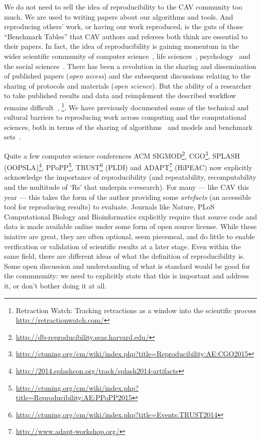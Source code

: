 \documentclass{llncs}
\begin{document}
We do not need to sell the idea of reproducibility to the CAV
community too much. We are used to writing papers about our algorithms
and tools.  And reproducing others' work, or having our work
reproduced, is the guts of those ``Benchmark Tables'' that CAV authors
and referees both think are essential to their papers. In fact, the
idea of reproducibility is gaining momentum in the wider scientific
community of computer science~\cite{collberg-et-al:2014}, life
sciences~\cite{rollins-et-al:2014},
psychology~\cite{chambers-et-al:2014} and the social
sciences~\cite{conte-et-al:2012}.
There has been a revolution in the sharing and dissemination of published
papers (\emph{open access}) and the subsequent discussions relating to
the sharing of protocols and materials (\emph{open science}). But the 
ability of a researcher to take published results and data and
reimplement the described workflow remains difficult~\cite{stodden-et-al:2013,sandve-et-al:2013,wilson-et-al:2014},
\footnote{Retraction Watch: Tracking retractions as a window
into the scientific
process\\\url{http://retractionwatch.com/}}. 
We have previously documented some of
the technical and cultural barriers to reproducing work across
computing and the computational sciences, both in terms of the sharing
of algorithms~\cite{crick-et-al_recomp2014} and models and benchmark
sets~\cite{crick-et-al_wssspe2}.

Quite a few computer science conferences ACM
SIGMOD\footnote{\url{http://db-reproducibility.seas.harvard.edu/}},
CGO\footnote{\url{http://ctuning.org/cm/wiki/index.php?title=Reproducibility:AE:CGO2015}},
SPLASH
(OOPSLA)\footnote{\url{http://2014.splashcon.org/track/splash2014-artifacts}},
PPoPP\footnote{\url{http://ctuning.org/cm/wiki/index.php?title=Reproducibility:AE:PPoPP2015}},
TRUST\footnote{\url{http://ctuning.org/cm/wiki/index.php?title=Events:TRUST2014}}
(PLDI) and ADAPT\footnote{\url{http://www.adapt-workshop.org/}}
(HiPEAC) now explicitly acknowledge the importance of reproducibility
(and repeatability, recomputability and the multitude of `Rs' that
underpin e-research).  For many --- like CAV this year --- this takes
the form of the author providing some \emph{artefacts} (an accessible
tool for reproducing results) to evaluate. Journals like Nature, PLoS
Computational Biology and Bioinformatics explicitly require that
source code and data is made available online under some form of open
source license. While these iniative are great, they are often
optional, seem piecemeal, and do little to enable verification or
validation of scientific results at a later stage. Even within the
same field, there are different ideas of what the definition of
reproducibility is. Some open discussion and understanding of what is
standard would be good for the commmunity: we need to explicitly state
that this is important and address it, or don't bother doing it at all.
\end{document}
